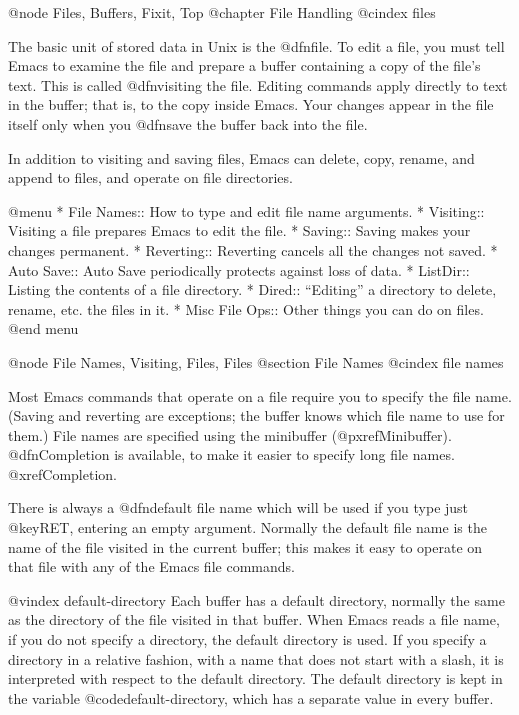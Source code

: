 {{{{{{{{{{{{{{{{{{{{@node Files, Buffers, Fixit, Top
@chapter File Handling
@cindex files

  The basic unit of stored data in Unix is the @dfn{file}.  To edit a file,
you must tell Emacs to examine the file and prepare a buffer containing a
copy of the file's text.  This is called @dfn{visiting} the file.  Editing
commands apply directly to text in the buffer; that is, to the copy inside
Emacs.  Your changes appear in the file itself only when you @dfn{save} the
buffer back into the file.

  In addition to visiting and saving files, Emacs can delete, copy, rename,
and append to files, and operate on file directories.

@menu
* File Names::   How to type and edit file name arguments.
* Visiting::     Visiting a file prepares Emacs to edit the file.
* Saving::       Saving makes your changes permanent.
* Reverting::    Reverting cancels all the changes not saved.
* Auto Save::    Auto Save periodically protects against loss of data.
* ListDir::      Listing the contents of a file directory.
* Dired::        ``Editing'' a directory to delete, rename, etc.
                  the files in it.
* Misc File Ops:: Other things you can do on files.
@end menu

@node File Names, Visiting, Files, Files
@section File Names
@cindex file names

  Most Emacs commands that operate on a file require you to specify the
file name.  (Saving and reverting are exceptions; the buffer knows which
file name to use for them.)  File names are specified using the minibuffer
(@pxref{Minibuffer}).  @dfn{Completion} is available, to make it easier to
specify long file names.  @xref{Completion}.

  There is always a @dfn{default file name} which will be used if you type
just @key{RET}, entering an empty argument.  Normally the default file name
is the name of the file visited in the current buffer; this makes it easy
to operate on that file with any of the Emacs file commands.

@vindex default-directory
  Each buffer has a default directory, normally the same as the directory
of the file visited in that buffer.  When Emacs reads a file name, if you
do not specify a directory, the default directory is used.  If you specify
a directory in a relative fashion, with a name that does not start with a
slash, it is interpreted with respect to the default directory.  The
default directory is kept in the variable @code{default-directory}, which
has a separate value in every buffer.

}}}}}}}}}}}}}}}}}}}}
